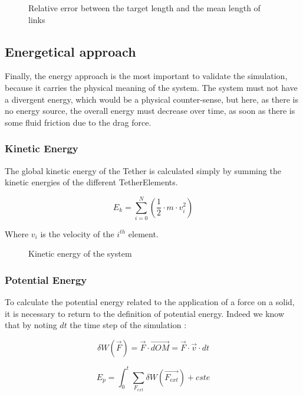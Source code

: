 \begin{figure}
    \centering
    
    \caption{Relative error between the target length and the mean length of links}
    \label{fig:error_length}
\end{figure}

\subsection{Energetical approach}

Finally, the energy approach is the most important to validate the simulation, because it carries the physical meaning of the system. The system must not have a divergent energy, which would be a physical counter-sense, but here, as there is no energy source, the overall energy must decrease over time, as soon as there is some fluid friction due to the drag force.

\subsubsection{Kinetic Energy}

The global kinetic energy of the Tether is calculated simply by summing the kinetic energies of the different TetherElements.

$$E_{k} = \sum_{i=0}^N \left(\frac{1}{2} \cdot m \cdot v_i^2 \right)$$

Where $v_i$ is the velocity of the $i^{th}$ element.

\begin{figure}
    \centering
    
    \caption{Kinetic energy of the system}
    \label{fig:kinetic_energy}
\end{figure}

\subsubsection{Potential Energy}

To calculate the potential energy related to the application of a force on a solid, it is necessary to return to the definition of potential energy. Indeed we know that by noting $dt$ the time step of the simulation :

$$\delta W(\overrightarrow{F}) = \overrightarrow{F} \cdot \overrightarrow{dOM} = \overrightarrow{F} \cdot \overrightarrow{v} \cdot dt$$

$$E_p = \int_0^t \sum_{F_{ext}} \delta W(\overrightarrow{F_{ext}}) + cste$$

